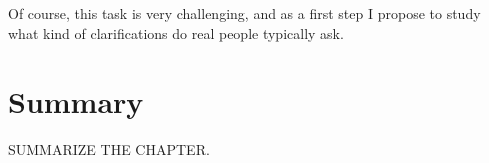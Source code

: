Of course, this task is very challenging, and as a first step I propose to study what kind of clarifications do real people typically ask.

\section{Summary}

SUMMARIZE THE CHAPTER.